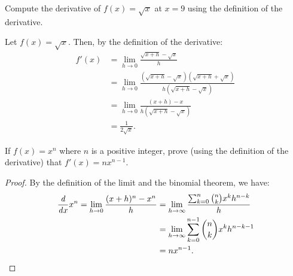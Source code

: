 \begin{problem}
  Compute the derivative of $f(x) = \sqrt{x}$ at $x = 9$ using the definition of the derivative.
  \vspace{\baselineskip}

  Let $f(x) = \sqrt{x}$. Then, by the definition of the derivative:
    \begin{align*}
      f'(x) &= \lim_{h \to 0}\frac{\sqrt{x+h} - \sqrt{x}}{h}\\
            &= \lim_{h \to 0}\frac{(\sqrt{x+h} - \sqrt{x})(\sqrt{x+h} + \sqrt{x})}{h(\sqrt{x+h} - \sqrt{x})}\\
            &= \lim_{h \to 0}\frac{(x + h) - x}{h(\sqrt{x+h} - \sqrt{x})}\\
            &= \frac{1}{2 \sqrt{x}}.
    \end{align*}
\end{problem}

\begin{problem}
  \label{prob:derivative-power-rule-positive-integers}
  If $f(x) = x^{n}$ where $n$ is a positive integer, prove (using the definition of the derivative) that 
  $f'(x) = nx^{n-1}$.

  \begin{proof}
    By the definition of the limit and the binomial theorem, we have:
    \begin{align*}
       \dfrac{\mathit{d} }{\mathit{d} x} x^n = \lim_{h \to 0} \frac{(x + h)^{n} - x^{n}}{h} &= \lim_{h \to \infty} \frac{\sum_{k=0}^{n}\binom{n}{k}x^{k}h^{n-k}}{h}\\
                                                     &= \lim_{h \to \infty} \sum_{k=0}^{n-1}\binom{n}{k}x^{k}h^{n-k-1}\\
                                                     &= nx^{n-1}.
    \end{align*}
  \end{proof}
\end{problem}

